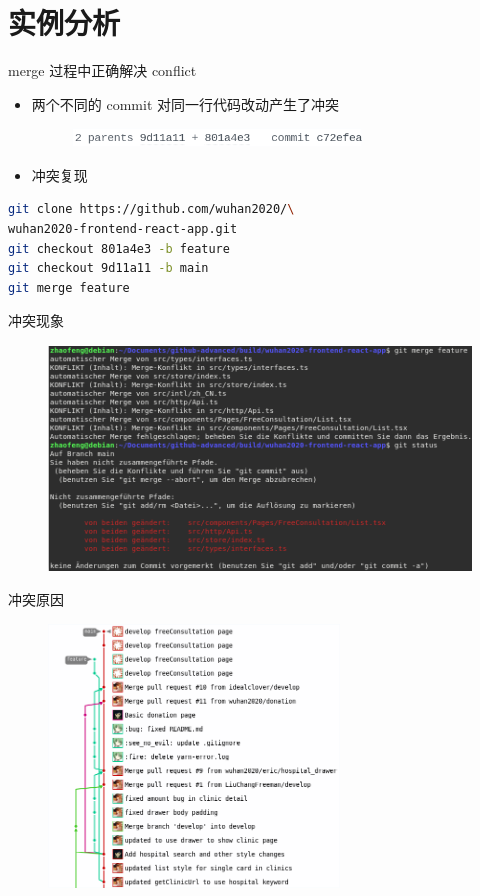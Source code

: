 \documentclass[notheorems,xetex]{beamer}
\begin{document}
\section{实例分析}
\frame{\tableofcontents[currentsection]}
\begin{frame}[fragile]{merge 过程中正确解决 conflict}
\begin{itemize}
\item 两个不同的 commit 对同一行代码改动产生了冲突
     \begin{figure}
	\centering
	\includegraphics[height=0.5cm]{conflict.png}
	\end{figure}
\item 冲突复现
\end{itemize}
\begin{lstlisting}[language=bash,xleftmargin=.1\textwidth]
git clone https://github.com/wuhan2020/\
wuhan2020-frontend-react-app.git
git checkout 801a4e3 -b feature
git checkout 9d11a11 -b main
git merge feature
\end{lstlisting}
\end{frame}
\begin{frame}{冲突现象}

\begin{figure}
	\centering
	\includegraphics[height=6cm]{phenomenon.png}
\end{figure}
\end{frame}
\begin{frame}{冲突原因}
\begin{figure}
	\centering
	\includegraphics[height=7cm]{deps.png}
\end{figure}
\end{frame}
\end{document}
